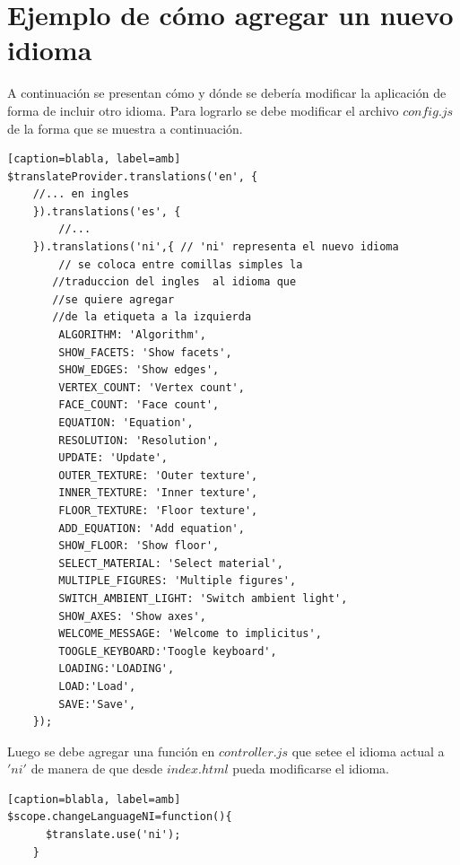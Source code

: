 \documentclass[12pt]{article}
\begin{document}
\section{Ejemplo de cómo agregar un nuevo idioma}
A continuación se presentan cómo y dónde se debería modificar la aplicación de forma de incluir otro idioma. 
Para lograrlo se debe modificar el archivo $config.js$ de la forma que se muestra a continuación.
\begin{lstlisting}[frame=single][caption=blabla, label=amb]
$translateProvider.translations('en', {
   	//... en ingles  
    }).translations('es', {
        //...                 
    }).translations('ni',{ // 'ni' representa el nuevo idioma
        // se coloca entre comillas simples la 
       //traduccion del ingles  al idioma que
       //se quiere agregar
       //de la etiqueta a la izquierda 
        ALGORITHM: 'Algorithm', 
        SHOW_FACETS: 'Show facets',
        SHOW_EDGES: 'Show edges',
        VERTEX_COUNT: 'Vertex count',
        FACE_COUNT: 'Face count',
        EQUATION: 'Equation',
        RESOLUTION: 'Resolution',
        UPDATE: 'Update',
        OUTER_TEXTURE: 'Outer texture',
        INNER_TEXTURE: 'Inner texture',
        FLOOR_TEXTURE: 'Floor texture',
        ADD_EQUATION: 'Add equation',
        SHOW_FLOOR: 'Show floor',
        SELECT_MATERIAL: 'Select material',
        MULTIPLE_FIGURES: 'Multiple figures',
        SWITCH_AMBIENT_LIGHT: 'Switch ambient light',
        SHOW_AXES: 'Show axes',
        WELCOME_MESSAGE: 'Welcome to implicitus',
        TOOGLE_KEYBOARD:'Toogle keyboard',
        LOADING:'LOADING',
        LOAD:'Load',
        SAVE:'Save', 
    });
\end{lstlisting}
Luego se debe agregar una función en $controller.js$ que setee el idioma actual a $'ni'$ de manera de que desde $index.html$ pueda modificarse el idioma.
\begin{lstlisting}[frame=single][caption=blabla, label=amb]
$scope.changeLanguageNI=function(){
      $translate.use('ni');
    }
\end{lstlisting}
\clearpage
\end{document}

